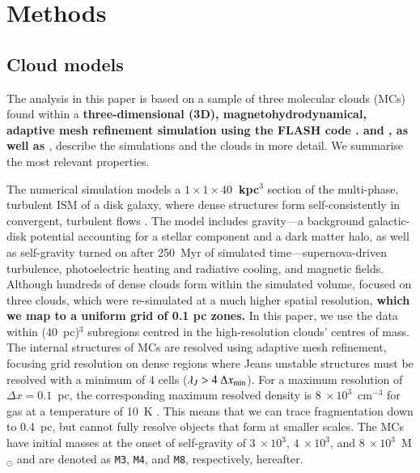 \section{Methods}\label{methods}


\subsection{Cloud models}\label{methods:clouds}

The analysis in this paper is based on a sample of three molecular clouds (MCs) found within a \textbf{three-dimensional (3D), magnetohydrodynamical, adaptive mesh refinement simulation %
using the FLASH code \citep{Fryxell2000}.  
 and , as well as \citet[ hereafter]{Chira2018}}, describe the simulations and the clouds in more detail. 
We summarise the most relevant properties. 

The numerical simulation models a \textbf{$1\times1\times40$~kpc$^3$} section of the multi-phase, turbulent ISM of a disk galaxy, where dense structures form self-consistently in convergent, turbulent flows .  
The model includes gravity---a background galactic-disk potential accounting for a stellar component and a dark matter halo, as well as self-gravity turned on after 250~Myr of simulated time---supernova-driven turbulence, photoelectric heating and radiative cooling, and magnetic fields. 
Although hundreds of dense clouds form within the simulated volume,  focused on three clouds, which were re-simulated at a much higher spatial resolution, \textbf{which we map to a uniform grid of 0.1 pc zones.}
In this paper, we use the data within (40~pc)$^{3}$ subregions centred in the high-resolution clouds' centres of mass.
The internal structures of MCs are resolved using adaptive mesh refinement, focusing grid resolution on dense regions where Jeans unstable structures must be resolved with a minimum of 4 cells ($\lambda_J > 4~\Delta x_{\rm min}$).
For a maximum resolution of $\Delta x = 0.1$~pc, the corresponding maximum resolved density is $8~\times 10^3$~cm$^{-3}$ for gas at a temperature of 10~K .
This means that we can trace fragmentation down to 0.4~pc, but cannot fully resolve objects that form at smaller scales.
The MCs have initial masses at the onset of self-gravity of $3~\times 10^3$, $4~\times 10^3$, and $8~\times 10^3$~M$_{\odot}$ and are denoted as \texttt{M3}, \texttt{M4}, and \texttt{M8}, respectively, hereafter.

